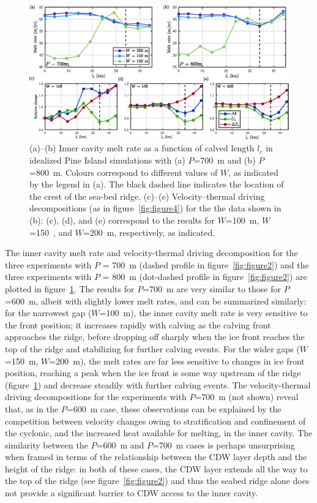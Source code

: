 \documentclass[draft]{agujournal2019}
\begin{document}
\begin{figure}
    \centering
    \includegraphics[width = \textwidth]{../make_figures/plots/figure8.eps}
    \caption{(a)--(b) Inner cavity melt rate as a function of calved length $l_c$ in idealized Pine Island simulations with (a) $P$=700~m and (b) $P$=800~m. Colours correspond to different values of $W$, as indicated by the legend in (a). The black dashed line indicates the location of the crest of the sea-bed ridge. (c)--(e) Velocity--thermal driving decompositions (as in figure~\ref{fig:figure4}) for the the data shown in (b): (c), (d), and (e) correspond to the results for $W$=100~m, $W$=150~, and $W$=200~m, respectively, as indicated. }
    \label{fig:figure8}
\end{figure}


The inner cavity melt rate and velocity-thermal driving decomposition for the three experiments with $P$ = 700~m (dashed profile in figure~\ref{fig:figure2}) and the three experiments with $P$ = 800~m (dot-dashed profile in figure~\ref{fig:figure2}) are plotted in figure~\ref{fig:figure8}. The results for $P$=700~m are very similar to those for $P$=600~m, albeit with slightly lower melt rates, and can be summarized similarly: for the narrowest gap ($W$=100~m), the inner cavity melt rate is very sensitive to the front position; it increases rapidly with calving as the calving front approaches the ridge, before dropping off sharply when the ice front reaches the top of the ridge and stabilizing for further calving events. For the wider gaps ($W$=150~m, $W$=200~m), the melt rates are far less sensitive to changes in ice front position, reaching a peak when the ice front is some way upstream of the ridge (figure~\ref{fig:figure8}) and decrease steadily with further calving events. The velocity-thermal driving decompositions for the experiments with $P$=700~m (not shown) reveal that, as in the $P$=600~m case, these observations can be explained by the competition between velocity changes owing to stratification and confinement of the cyclonic, and the increased heat available for melting, in the inner cavity. The similarity between the $P$=600~m and $P$=700~m cases is perhaps unsurprising when framed in terms of the relationship between the CDW layer depth and the height of the ridge: in both of these cases, the CDW layer extends all the way to the top of the ridge (see figure~\ref{fig:figure2}) and thus the seabed ridge alone does not provide a significant barrier to CDW access to the inner cavity.
\end{document}
